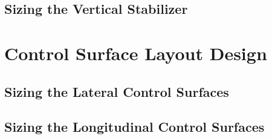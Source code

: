 \documentclass[conf]{new-aiaa}
\begin{document}
\subsection{Sizing the Vertical Stabilizer}

\section{Control Surface Layout Design}
\subsection{Sizing the Lateral Control Surfaces}
\subsection{Sizing the Longitudinal Control Surfaces}
\end{document}
